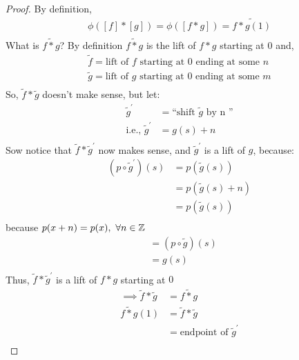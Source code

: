 \documentclass[../notes.tex]{subfiles}
\begin{document}
\begin{itemize}
\begin{proof}
                By definition,
                \begin{align*}
                    \phi([f]*[g])=\phi([f*g])=\tilde{f*g(1)}\\
                \end{align*}
                What is $\tilde{f*g}$? By definition $\tilde{f*g}$ is the lift of $f*g$
                starting at $0$ and,
                \begin{align*}
                    \tilde{f}=\text{lift of $f$ starting at 0 ending at some $n$}\\
                    \tilde{g}=\text{lift of $g$ starting at 0 ending at some $m$}\\
                \end{align*}
                So, $\tilde{f}*\tilde{g}$ doesn't make sense, but let:
                \begin{align*}
                    \tilde{g}^{\prime}&=\text{``shift $\tilde{g}$ by n ''}\\
                    \text{i.e., }\tilde{g}^{'}&=g(s)+n\\
                \end{align*}
                Sow notice that $\tilde{f}*\tilde{g}^{'}$ now makes sense, and $\tilde{g}^{'}$ is a
                lift of $g$, because:
                \begin{align*}
                    (p\circ\tilde{g}^{'})(s)&=p(\tilde{g}(s))\\
                    &=p(\tilde{g}(s)+n)\\
                    &=p(\tilde{g}(s))\\
                \end{align*}
                because $p(x+n)=p(x),\ \forall n\in\mathbb{Z}$
                \begin{align*}
                    &=(p\circ\tilde{g})(s)\\
                    &=g(s)\\
                \end{align*}
                Thus, $\tilde{f}*\tilde{g}^{'}$ is a lift of $f*g$ starting at $0$\\
                \begin{align*}
                    \implies \tilde{f}*\tilde{g}&=\tilde{f*g}\\
                    \tilde{f*g}(1)&=\tilde{f}*\tilde{g}\\
                    &=\text{endpoint of $\tilde{g}^{\prime}$}\\

\end{align*}
\end{proof}
\end{itemize}
\end{document}
